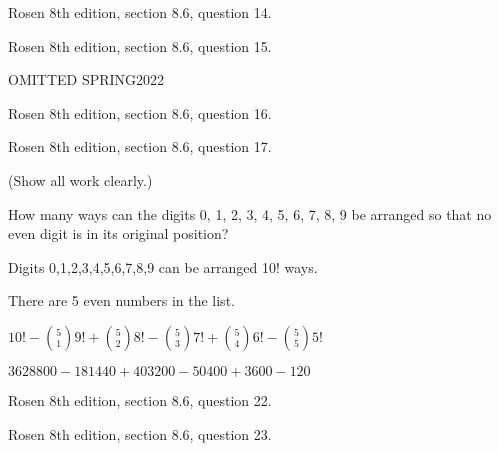 \SOLUTION



\newpage
\nextq Rosen 8th edition, section 8.6, question 14.

\SOLUTION



\newpage
\nextq Rosen 8th edition, section 8.6, question 15.

\SOLUTION

OMITTED SPRING2022
%

\newpage
\nextq Rosen 8th edition, section 8.6, question 16.

\SOLUTION



\newpage
\nextq Rosen 8th edition, section 8.6, question 17.

(Show all work clearly.)

How many ways can the digits 0, 1, 2, 3, 4, 5, 6, 7, 8, 9 be
arranged so that no even digit is in its original position?

Digits {0,1,2,3,4,5,6,7,8,9} can be arranged 10! ways.

There are 5 even numbers in the list.

$10! - \binom{5}{1}9! + \binom{5}{2}8! - \binom{5}{3}7! + \binom{5}{4}6! -\binom{5}{5}5!$

$3628800-181440+403200-50400+3600-120$


\SOLUTION



\newpage
\nextq Rosen 8th edition, section 8.6, question 22.

\SOLUTION



\newpage
\nextq Rosen 8th edition, section 8.6, question 23.

\SOLUTION



\newpage


